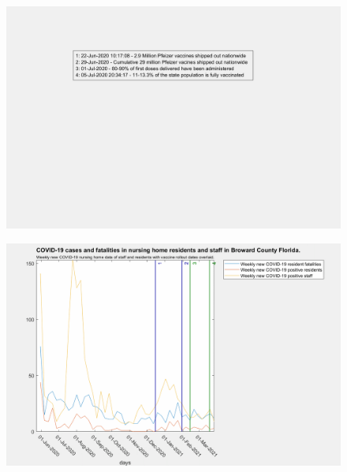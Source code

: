 \documentclass[twoside]{article}
\begin{document}
\begin{multicols}{2}
\begin{figure}[H]
	\includegraphics[width=\linewidth]{legends/new_vaccine_rollout_legend.png}
	\caption{}
	\label{fig:legends/new_vaccine_rollout_legendLabel}
\end{figure}


\begin{figure}[H]
	\includegraphics[width=\linewidth]{images/broward_nursing_home_with_vaccine.png}
	\caption{}
	\label{fig:images/broward_nursing_home_with_vaccineLabel}
\end{figure}


\end{multicols}
\end{document}
